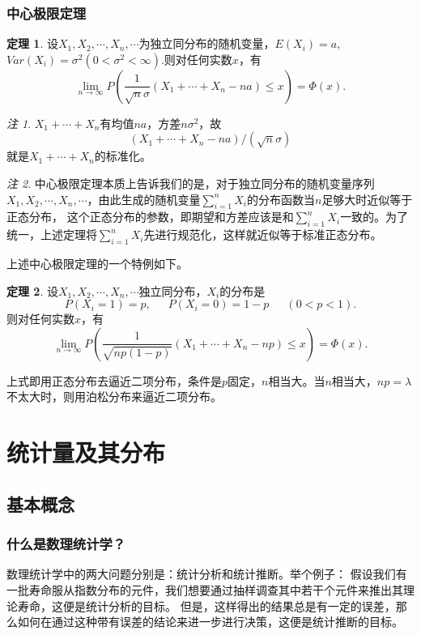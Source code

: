 \documentclass[a4paper,11pt]{article}%
\theoremstyle{remark}
\newtheorem*{remark}{注}
\theoremstyle{remark}
\theoremstyle{definition}
\newtheorem{theorem}{定理}[section]
\theoremstyle{definition}
\theoremstyle{plain}
\begin{document}
\subsubsection{中心极限定理}
\begin{theorem}
    设$X_1,X_2,\cdots,X_n,\cdots$为独立同分布的随机变量，$E(X_i)=a$,\\$Var(X_i)=\sigma^2(0<\sigma^2<\infty)$.则对任何实数$x$，有
    \[\lim_{n\rightarrow\infty}P(\frac{1}{\sqrt{n}\sigma}(X_1+\cdots+X_n-na)\leq x)=\Phi(x).\]
\end{theorem}
\begin{remark}$X_1+\cdots+X_n$有均值$na$，方差$n\sigma^2$，故
    \[(X_1+\cdots+X_n-na)/(\sqrt{n}\sigma)\]
    就是$X_1+\cdots+X_n$的标准化。
\end{remark}
\begin{remark}
    中心极限定理本质上告诉我们的是，对于独立同分布的随机变量序列$X_1,X_2,\cdots,X_n,\cdots$，由此生成的随机变量$\sum_{i=1}^{n}X_i$的分布函数当$n$足够大时近似等于正态分布，
    这个正态分布的参数，即期望和方差应该是和$\sum_{i=1}^{n}X_i$一致的。为了统一，上述定理将$\sum_{i=1}^{n}X_i$先进行规范化，这样就近似等于标准正态分布。
\end{remark}
上述中心极限定理的一个特例如下。
\begin{theorem}
    设$X_1,X_2,\cdots,X_n,\cdots$独立同分布，$X_i$的分布是 
    \[P(X_i=1)=p,\phantom{111}P(X_i=0)=1-p\phantom{111}(0<p<1).\]
    则对任何实数$x$，有 
    \[\lim_{n\rightarrow\infty}P(\frac{1}{\sqrt{np(1-p)}}(X_1+\cdots+X_n-np)\leq x)=\Phi(x).\]
\end{theorem}
上式即用正态分布去逼近二项分布，条件是$p$固定，$n$相当大。当$n$相当大，$np=\lambda$不太大时，则用泊松分布来逼近二项分布。
\section{统计量及其分布}
\subsection{基本概念}
\subsubsection{什么是数理统计学？}
数理统计学中的两大问题分别是：统计分析和统计推断。举个例子：
假设我们有一批寿命服从指数分布的元件，我们想要通过抽样调查其中若干个元件来推出其理论寿命，这便是统计分析的目标。
但是，这样得出的结果总是有一定的误差，那么如何在通过这种带有误差的结论来进一步进行决策，这便是统计推断的目标。
\end{document}
